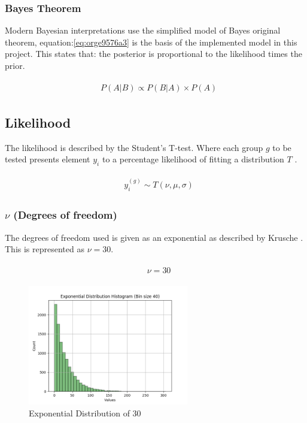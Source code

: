 \documentclass[11pt]{report}
\begin{document}
\subsubsection{Bayes Theorem}
\label{sec:orgc543f5d}

Modern Bayesian interpretations use the simplified model of Bayes original theorem, equation:\ref{eq:orge9576a3} is the basis of the implemented model in this project. This states that: the posterior is proportional to the likelihood times the prior.

\begin{align}
\label{eq:orge9576a3}
  &\begin{aligned}
  P(A|B) \propto P(B|A) \times P(A)
  \end{aligned}
\end{align}


\subsection{Likelihood}
\label{sec:org843c0df}
The likelihood is described by the Student's T-test. Where each group \(g\) to be tested presents element \(y_i\) to a percentage likelihood of fitting a distribution \(T\) .

 \begin{align}
\label{eq:org5c8df2a}
   &\begin{aligned}
y_i^{(g)} \sim T(\nu, \mu, \sigma)
   \end{aligned}
 \end{align}

\subsubsection{\(\nu\) (Degrees of freedom)}
\label{sec:org3b91865}
The degrees of freedom used is given as an exponential as described by
Krusche \cite{Kruschke2012}. This is represented as \(\nu = 30\).

 \begin{align}
\label{eq:org620a307}
   &\begin{aligned}
\nu = 30
   \end{aligned}
 \end{align}

\begin{figure}[htbp]
\centering
\includegraphics[width=7cm]{./images/dist2.png}
\caption{\label{fig:org32ac0b8}
Exponential Distribution of 30}
\end{figure}
\end{document}
